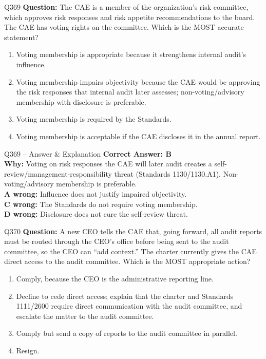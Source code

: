 \documentclass[aspectratio=169,10pt]{beamer}
\begin{document}
	\begin{frame}[t]{Q369}
		\small
		\textbf{Question:} The CAE is a member of the organization's risk committee, which approves risk responses and risk appetite recommendations to the board. The CAE has voting rights on the committee. Which is the MOST accurate statement?
		\begin{enumerate}[label=\Alph*.,itemsep=1pt,topsep=2pt]
			\item Voting membership is appropriate because it strengthens internal audit's influence.
			\item Voting membership impairs objectivity because the CAE would be approving the risk responses that internal audit later assesses; non-voting/advisory membership with disclosure is preferable.
			\item Voting membership is required by the Standards.
			\item Voting membership is acceptable if the CAE discloses it in the annual report.
		\end{enumerate}
	\end{frame}
	
	\begin{frame}[t]{Q369 -- Answer \& Explanation}
		\small
		\textbf{Correct Answer: B} \\[4pt]
		\textbf{Why:} Voting on risk responses the CAE will later audit creates a self-review/management-responsibility threat (Standards 1130/1130.A1). Non-voting/advisory membership is preferable. \\[4pt]
		\textbf{A wrong:} Influence does not justify impaired objectivity. \\[2pt]
		\textbf{C wrong:} The Standards do not require voting membership. \\[2pt]
		\textbf{D wrong:} Disclosure does not cure the self-review threat.
	\end{frame}
	
	\begin{frame}[t]{Q370}
		\small
		\textbf{Question:} A new CEO tells the CAE that, going forward, all audit reports must be routed through the CEO's office before being sent to the audit committee, so the CEO can ``add context.'' The charter currently gives the CAE direct access to the audit committee. Which is the MOST appropriate action?
		\begin{enumerate}[label=\Alph*.,itemsep=1pt,topsep=2pt]
			\item Comply, because the CEO is the administrative reporting line.
			\item Decline to cede direct access; explain that the charter and Standards 1111/2600 require direct communication with the audit committee, and escalate the matter to the audit committee.
			\item Comply but send a copy of reports to the audit committee in parallel.
			\item Resign.
		\end{enumerate}
	\end{frame}
	
\end{document}

